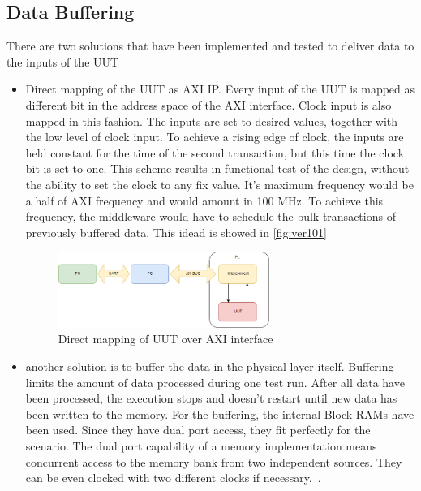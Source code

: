 \subsection{Data Buffering}
There are two solutions that have been implemented and tested to deliver data to the inputs of the UUT
\begin{itemize}
    \item Direct mapping of the UUT as AXI IP. Every input of the UUT is mapped as different bit in the address space of the AXI interface. Clock input is also mapped in this fashion. The inputs are set to desired values, together with the low level of clock input. To achieve a rising edge of clock, the inputs are held constant for the time of the second transaction, but this time the clock bit is set to one. This scheme results in functional test of the design, without the ability to set the clock to any fix value. It's maximum frequency would be a half of AXI frequency and would amount in 100 MHz. To achieve this frequency, the middleware would have to schedule the bulk transactions of previously buffered data. This idead is showed in \autoref{fig:ver101}
\begin{figure}[h]
\centering
\includegraphics[width=0.65\textwidth]{figures/Version101.png}
\caption{Direct mapping of UUT over AXI interface}
\label{fig:ver101}
\end{figure}
    \item another solution is to buffer the data in the physical layer itself. Buffering limits the amount of data processed during one test run. After all data have been processed, the execution stops and doesn't restart until new data has been written to the memory. For the buffering, the internal Block RAMs have been used. Since they have dual port access, they fit perfectly for the scenario. The dual port capability of a memory implementation means concurrent access to the memory bank from two independent sources. They can be even clocked with two different clocks if necessary.~\cite{report:BRAM}.

\end{itemize}
